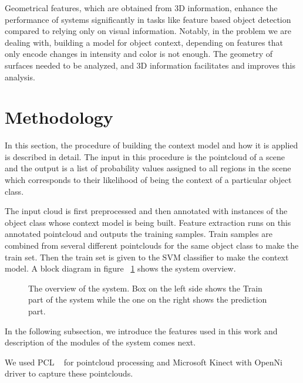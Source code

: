 Geometrical features, which are obtained from 3D information, enhance the performance of systems significantly in tasks like feature 
based object detection compared to relying only on visual information. 
Notably, in the problem we are dealing with, building a model for object context, depending on features that only encode changes in intensity and color is not enough. The geometry of surfaces needed to be analyzed, and 3D information facilitates and improves this analysis.



\section{Methodology}
\label{Implementation.sec}

In this section, the procedure of building the context model and how it is applied is described in detail. 
The input in this procedure is the pointcloud of a scene and the output is a list of probability values assigned to all regions in
the scene which corresponds to their likelihood of being the context of a particular object class. 


The input cloud is first preprocessed and then annotated with instances of the object class whose context model is being built. 
Feature extraction runs on this annotated pointcloud and outputs the training samples. Train samples are combined from several different pointclouds for the same object class to make the train set. 
Then the train set is given to the SVM classifier to make the context model. A block diagram in figure ~\ref{SystemOverview.figure} shows 
the system overview.

\begin{figure}[t]
  \caption[System Overview]
  {The overview of the system. Box on the left side shows the Train part of the system while the one on the right shows the prediction part.}
  \label{SystemOverview.figure}
\end{figure}

In the following subsection, we introduce the features used in this work and description of the modules of the system comes next.

We used PCL ~\cite{Rusu_ICRA2011_PCL} for pointcloud processing and Microsoft Kinect with OpenNi driver to capture these pointclouds.


